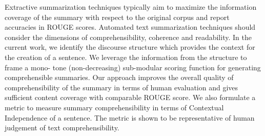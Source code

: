 Extractive summarization techniques typically aim to maximize the information coverage of the summary with respect to the original corpus and report accuracies in ROUGE scores. Automated text summarization techniques should consider the dimensions of comprehensibility, coherence and readability. In the current work, we identify the discourse structure which provides the context for the creation of a sentence. We leverage the information from the structure to frame a mono- tone (non-decreasing) sub-modular scoring function for generating comprehensible summaries. Our approach improves the overall quality of comprehensibility of the summary in terms of human evaluation and gives sufficient content coverage with comparable ROUGE score. We also formulate a metric to measure summary comprehensibility in terms of Contextual Independence of a sentence. The metric is shown to be representative of human judgement of text comprehensibility.
